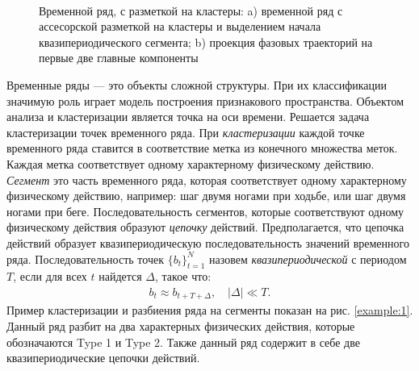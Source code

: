 \begin{figure}[h!t]\center
{}
\\
\caption{Временной ряд, с разметкой на кластеры: a) временной ряд с ассесорской разметкой на кластеры и выделением начала квазипериодического сегмента; b) проекция фазовых траекторий на первые две главные компоненты}
\end{figure}

Временные ряды --- это объекты сложной структуры. 
При их классификации значимую роль играет модель построения признакового пространства.
Объектом анализа и кластеризации является точка на оси времени. 
Решается задача кластеризации точек временного ряда. 
При \textit{кластеризации} каждой точке временного ряда ставится в соответствие метка из конечного множества меток. 
Каждая метка соответствует одному характерному физическому действию. \textit{Сегмент} это часть временного ряда, которая соответствует одному характерному физическому действию, например: шаг двумя ногами при ходьбе, или шаг двумя ногами при беге.
Последовательность сегментов, которые соответствуют одному физическому действия образуют \textit{цепочку} действий. 
Предполагается, что цепочка действий образует квазипериодическую последовательность значений временного ряда.
Последовательность точек $\{b_t\}_{t=1}^{N}$ назовем \textit{квазипериодической} с периодом $T$, если для всех $t$ найдется $\Delta$, такое что:
\[
\label{eq:int:1}
\begin{aligned}
b_t \approx b_{t+T+\Delta}, \quad \left|\Delta\right| \ll T.
\end{aligned}
\]
Пример кластеризации и разбиения ряда на сегменты показан на рис. \ref{example:1}. Данный ряд разбит на два характерных физических действия, которые обозначаются Type 1 и Type 2. Также данный ряд содержит в себе две квазипериодические цепочки действий.

